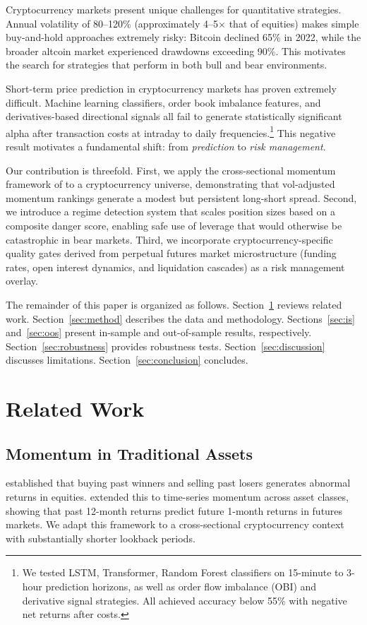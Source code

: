 \documentclass[12pt,a4paper]{article}
\begin{document}
Cryptocurrency markets present unique challenges for quantitative strategies. Annual volatility of 80--120\% (approximately 4--5$\times$ that of equities) makes simple buy-and-hold approaches extremely risky: Bitcoin declined 65\% in 2022, while the broader altcoin market experienced drawdowns exceeding 90\%. This motivates the search for strategies that perform in both bull and bear environments.

Short-term price prediction in cryptocurrency markets has proven extremely difficult. Machine learning classifiers, order book imbalance features, and derivatives-based directional signals all fail to generate statistically significant alpha after transaction costs at intraday to daily frequencies.\footnote{We tested LSTM, Transformer, Random Forest classifiers on 15-minute to 3-hour prediction horizons, as well as order flow imbalance (OBI) and derivative signal strategies. All achieved accuracy below 55\% with negative net returns after costs.} This negative result motivates a fundamental shift: from \emph{prediction} to \emph{risk management}.

Our contribution is threefold. First, we apply the cross-sectional momentum framework of \citet{moskowitz2012time} to a cryptocurrency universe, demonstrating that vol-adjusted momentum rankings generate a modest but persistent long-short spread. Second, we introduce a regime detection system that scales position sizes based on a composite danger score, enabling safe use of leverage that would otherwise be catastrophic in bear markets. Third, we incorporate cryptocurrency-specific quality gates derived from perpetual futures market microstructure (funding rates, open interest dynamics, and liquidation cascades) as a risk management overlay.

The remainder of this paper is organized as follows. Section~\ref{sec:related} reviews related work. Section~\ref{sec:method} describes the data and methodology. Sections~\ref{sec:is} and~\ref{sec:oos} present in-sample and out-of-sample results, respectively. Section~\ref{sec:robustness} provides robustness tests. Section~\ref{sec:discussion} discusses limitations. Section~\ref{sec:conclusion} concludes.

\section{Related Work}
\label{sec:related}

\subsection{Momentum in Traditional Assets}
\citet{jegadeesh1993returns} established that buying past winners and selling past losers generates abnormal returns in equities. \citet{moskowitz2012time} extended this to time-series momentum across asset classes, showing that past 12-month returns predict future 1-month returns in futures markets. We adapt this framework to a cross-sectional cryptocurrency context with substantially shorter lookback periods.
\end{document}
